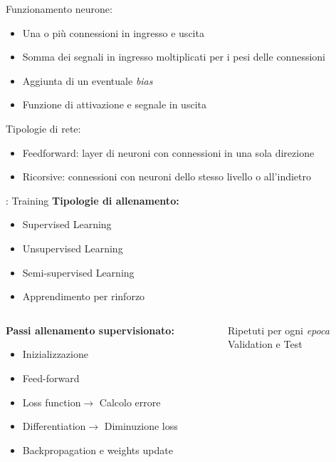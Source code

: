 \documentclass[xcolor=x11names,compress, 
]{beamer}
\theoremstyle{definition} \newtheorem{esempio}{Esempio}
\theoremstyle{definition}
\begin{document}
		\begin{frame}{\subsecname}
			Funzionamento neurone:
			\begin{itemize}
				\item Una o più connessioni in ingresso e uscita
				\item Somma dei segnali in ingresso moltiplicati per i pesi delle connessioni
				\item Aggiunta di un eventuale \textit{bias}
				\item Funzione di attivazione e segnale in uscita
			\end{itemize}
			
			Tipologie di rete:
			\begin{itemize}
				\item Feedforward: layer di neuroni con connessioni in una sola direzione
				\item Ricorsive: connessioni con neuroni dello stesso livello o all'indietro
			\end{itemize}
		\end{frame}
		
		\begin{frame}{\subsecname: Training}
				\textbf{Tipologie di allenamento:}
				\begin{itemize}
					\item Supervised Learning\pause
					\item Unsupervised Learning\pause
					\item Semi-supervised Learning\pause
					\item Apprendimento per rinforzo
				\end{itemize}\pause
			\begin{columns}
				\begin{column}{0.7\textwidth}
					\textbf{Passi allenamento supervisionato:}
					\begin{itemize}
						\item Inizializzazione\pause
						\item Feed-forward\pause
						\item Loss function\pause $\rightarrow$ Calcolo errore\pause
						\item Differentiation\pause $\rightarrow$ Diminuzione loss\pause
						\item Backpropagation e weights update
					\end{itemize}\pause
				\end{column}
				\begin{column}{0.3\textwidth}
					\begin{center}
						Ripetuti per ogni \textit{epoca}\\
						Validation e Test
					\end{center}
				\end{column}
			\end{columns}
		\end{frame}
	
\end{document}
